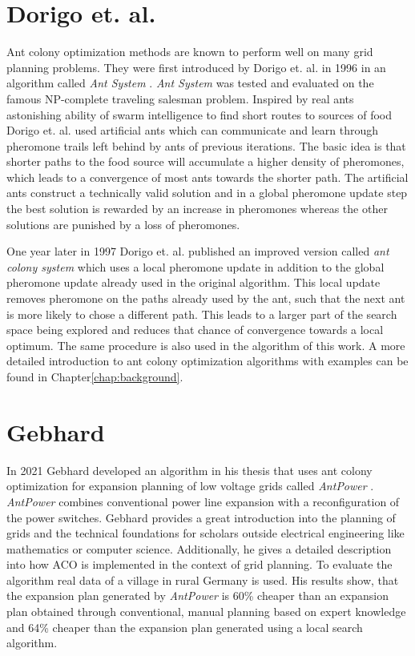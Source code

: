 \section{Dorigo et. al.}
Ant colony optimization methods are known to perform well on many grid planning problems. They were first introduced by Dorigo et. al. in 1996 in an algorithm called \textit{Ant System} \cite{ant_system}. \textit{Ant System} was tested and evaluated on the famous NP-complete traveling salesman problem. Inspired by real ants astonishing ability of swarm intelligence to find short routes to sources of food Dorigo et. al. used artificial ants which can communicate and learn through pheromone trails left behind by ants of previous iterations.
The basic idea is that shorter paths to the food source will accumulate a higher density of pheromones, which leads to a convergence of most ants towards the shorter path. The artificial ants construct a technically valid solution and in a global pheromone update step the best solution is rewarded by an increase in pheromones whereas the other solutions are punished by a loss of pheromones.

One year later in 1997 Dorigo et. al. published an improved version called \textit{ant colony system} \cite{ant_coloy_system} which uses a local pheromone update in addition to the global pheromone update already used in the original algorithm. This local update removes pheromone on the paths already used by the ant, such that the next ant is more likely to chose a different path. This leads to a larger part of the search space being explored and reduces that chance of convergence towards a local optimum. The same procedure is also used in the algorithm of this work. A more detailed introduction to ant colony optimization algorithms with examples can be found in Chapter\ref{chap:background}.\\

\section{Gebhard}
In 2021 Gebhard developed an algorithm in his thesis that uses ant colony optimization for expansion planning of low voltage grids called \textit{AntPower} \cite{gebhard2021expansion}. \textit{AntPower} combines conventional power line expansion with a reconfiguration of the power switches. Gebhard provides a great introduction into the planning of grids and the technical foundations for scholars outside electrical engineering like mathematics or computer science. Additionally, he gives a detailed description into how ACO is implemented in the context of grid planning. To evaluate the algorithm real data of a village in rural Germany is used. His results show, that the expansion plan generated by \textit{AntPower} is 60\% cheaper than an expansion plan obtained through conventional, manual planning based on expert knowledge and 64\% cheaper than the expansion plan generated using a local search algorithm.

